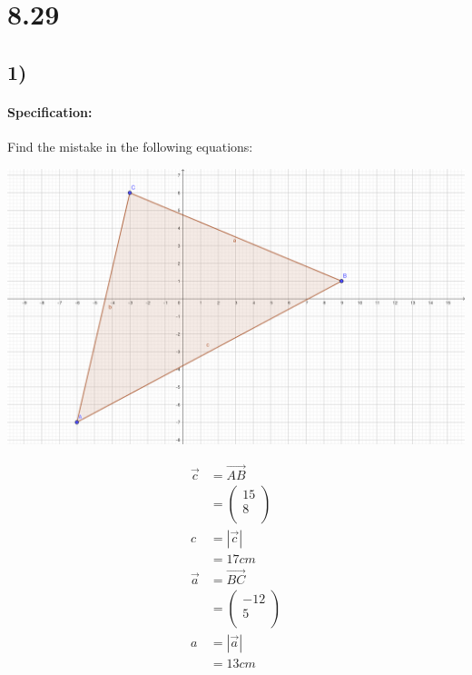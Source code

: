 \section{8.29}
\subsection{1)}
\paragraph{Specification:}
Find the mistake in the following equations:

\def\AB{\begin{pmatrix}
    15 \\
    8 \\
\end{pmatrix}}

\def\BC{\begin{pmatrix}
    -12 \\
    5 \\
\end{pmatrix}}

\def\cosval{-0.633...}
\def\cosang{129.31}
\def\cosanginv{\pgfmathparse{180 - \cosang}\pgfmathresult}
\def\sinofang{\pgfmathparse{sin(\cosang)}\pgfmathresult}
\def\sinofanginv{\pgfmathparse{sin(180 - \cosang)}\pgfmathresult}

\includegraphics[width=\linewidth]{images/8-29-1.png}

\begin{align}
    \vec{c} &= \vec{AB} \\ 
    &= \AB \\
    c &= |\vec{c}|  \\
    &= 17cm \\[20pt]
    \vec{a} &= \vec{BC} \\
    &= \BC \\
    a &= |\vec{a}| \\
    &= 13cm \\[20pt]
\end{align}

